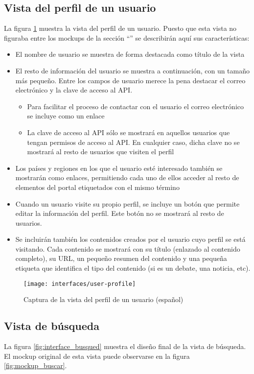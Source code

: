 \subsection{Vista del perfil de un usuario}
La figura \ref{fig:interface_perfil_usuario} muestra la vista del perfil de un usuario.  Puesto que esta vista no figuraba entre los mockups de la sección ``'' se describirán aquí sus características:
\begin{itemize}
	\item El nombre de usuario se muestra de forma destacada como título de la vista
	\item El resto de información del usuario se muestra a continuación, con un tamaño más pequeño.  Entre los campos de usuario merece la pena destacar el correo electrónico y la clave de acceso al API.
	\begin{itemize}
		\item Para facilitar el proceso de contactar con el usuario el correo electrónico se incluye como un enlace
		\item La clave de acceso al API sólo se mostrará en aquellos usuarios que tengan permisos de acceso al API.  En cualquier caso, dicha clave no se mostrará al resto de usuarios que visiten el perfil
	\end{itemize}
	\item Los países y regiones en los que el usuario esté interesado también se mostrarán como enlaces, permitiendo cada uno de ellos acceder al resto de elementos del portal etiquetados con el mismo término
	\item Cuando un usuario visite su propio perfil, se incluye un botón que permite editar la información del perfil.  Este botón no se mostrará al resto de usuarios.
	\item Se incluirán también los contenidos creados por el usuario cuyo perfil se está visitando.  Cada contenido se mostrará con su título (enlazado al contenido completo), su URL, un pequeño resumen del contenido y una pequeña etiqueta que identifica el tipo del contenido (si es un debate, una noticia, etc).
\end{itemize}
\begin{figure}[h]
	\centering
	\texttt{[image: interfaces/user-profile]}
	\caption{Captura de la vista del perfil de un usuario (español)}
	\label{fig:interface_perfil_usuario}
\end{figure}


\subsection{Vista de búsqueda}
La figura \ref{fig:interface_busqued} muestra el diseño final de la vista de búsqueda.  El mockup original de esta vista puede observarse en la figura \ref{fig:mockup_buscar}.

